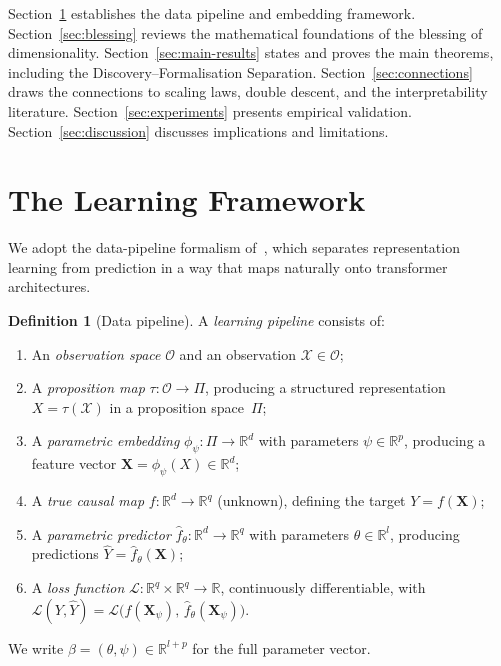 \documentclass[11pt,a4paper]{article}
\theoremstyle{plain}
\theoremstyle{definition}
\newtheorem{definition}[theorem]{Definition}
\theoremstyle{remark}
\newcommand{\R}{\mathbb{R}}
\newcommand{\cO}{\mathcal{O}}
\newcommand{\cX}{\mathcal{X}}
\newcommand{\cL}{\mathcal{L}}
\begin{document}
Section~\ref{sec:framework} establishes the data pipeline and embedding
framework.  Section~\ref{sec:blessing} reviews the mathematical foundations of
the blessing of dimensionality.  Section~\ref{sec:main-results} states and proves
the main theorems, including the Discovery--Formalisation Separation.
Section~\ref{sec:connections} draws the connections to scaling laws, double
descent, and the interpretability literature.
Section~\ref{sec:experiments} presents empirical validation.
Section~\ref{sec:discussion} discusses implications and limitations.


\section{The Learning Framework}\label{sec:framework}

We adopt the data-pipeline formalism of~\citet{omega2026}, which separates
representation learning from prediction in a way that maps naturally onto
transformer architectures.

\begin{definition}[Data pipeline]\label{def:pipeline}
A \emph{learning pipeline} consists of:
\begin{enumerate}[label=(\roman*),leftmargin=2.5em,itemsep=2pt]
  \item An \emph{observation space} $\cO$ and an observation $\cX \in \cO$;
  \item A \emph{proposition map} $\tau : \cO \to \Pi$, producing a structured
    representation $X = \tau(\cX)$ in a proposition space~$\Pi$;
  \item A \emph{parametric embedding} $\phi_\psi : \Pi \to \R^d$ with parameters
    $\psi \in \R^p$, producing a feature vector
    $\mathbf{X} = \phi_\psi(X) \in \R^d$;
  \item A \emph{true causal map} $f : \R^d \to \R^q$ (unknown), defining the
    target $Y = f(\mathbf{X})$;
  \item A \emph{parametric predictor} $\hat{f}_\theta : \R^d \to \R^q$ with
    parameters $\theta \in \R^l$, producing predictions
    $\hat{Y} = \hat{f}_\theta(\mathbf{X})$;
  \item A \emph{loss function}
    $\cL : \R^q \times \R^q \to \R$, continuously differentiable, with
    $\cL(Y,\hat{Y}) = \cL\bigl(f(\mathbf{X}_\psi),\,
    \hat{f}_\theta(\mathbf{X}_\psi)\bigr)$.
\end{enumerate}
We write $\beta = (\theta,\psi) \in \R^{l+p}$ for the full parameter vector.
\end{definition}
\end{document}
